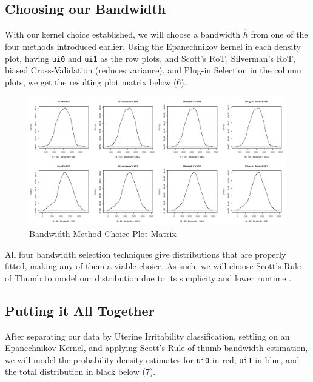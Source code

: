\documentclass{article}
\begin{document}
\subsection{Choosing our Bandwidth}

With our kernel choice established, we will choose a bandwidth $\hat h$ from one of the four methods introduced earlier. Using the Epanechnikov kernel in each density plot, having \texttt{ui0} and \texttt{ui1} as the row plots, and Scott's RoT, Silverman's RoT, biased Cross-Validation (reduces variance), and Plug-in Selection in the column plots, we get the resulting plot matrix below (6).

\begin{figure}[h]
    \centering
    \includegraphics[scale = 0.25]{volume/KDE_bandwidth_choices.png}
    \caption{Bandwidth Method Choice Plot Matrix}
    \label{fig:bw-plots}
\end{figure}

\newpage

All four bandwidth selection techniques give distributions that are properly fitted, making any of them a viable choice. As such, we will choose Scott's Rule of Thumb to model our distribution due to its simplicity and lower runtime \cite{Raykar01012010}.

\subsection{Putting it All Together}

After separating our data by Uterine Irritability classification, settling on an Epanechnikov Kernel, and applying Scott's Rule of thumb bandwidth estimation, we will model the probability density estimates for \texttt{ui0} in red, \texttt{ui1} in blue, and the total distribution in black below (7).
\end{document}
